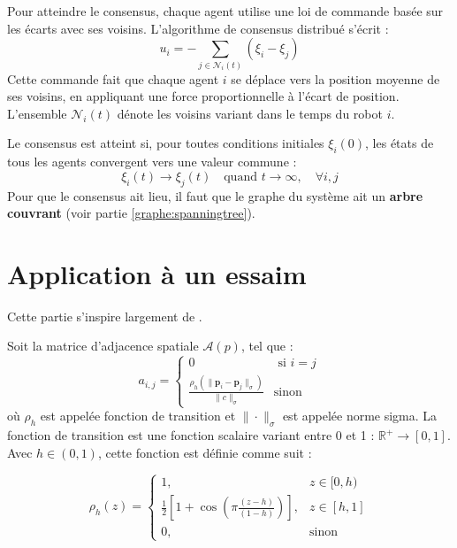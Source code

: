 Pour atteindre le consensus, chaque agent utilise une loi de commande basée sur les écarts avec ses voisins. L'algorithme de consensus distribué s'écrit :
\begin{equation}
    u_i = -\sum_{j \in \mathcal{N}_i(t)} (\xi_i - \xi_j)
\end{equation}
Cette commande fait que chaque agent $i$ se déplace vers la position moyenne de ses voisins, en appliquant une force proportionnelle à l'écart de position. L'ensemble $\mathcal{N}_i(t)$ dénote les voisins variant dans le temps du robot $i$.

Le consensus est atteint si, pour toutes conditions initiales $\xi_i(0)$, les états de tous les agents convergent vers une valeur commune :
$$\xi_i(t) \to \xi_j(t) \quad \text{quand } t \to \infty, \quad \forall i,j$$
Pour que le consensus ait lieu, il faut que le graphe du système ait un \textbf{arbre couvrant} (voir partie \ref{graphe:spanningtree}).

\section{Application à un essaim}

\noindent Cette partie s'inspire largement de \cite{koung_cooperative_2022,olfati-saber_flocking_2006,saif_distributed_2019}.

\noindent Soit la matrice d'adjacence spatiale $\mathcal{A}(p)$, tel que : 
\begin{equation}
    a_{i,j} =
    \begin{cases}
    0 & \text{ si } i=j  
     \\
    \frac{\rho_h(\|\mathbf{p}_i - \mathbf{p}_j\|_\sigma)}{\|c\|_\sigma} & \text{sinon}
    \end{cases}
\end{equation}
où $\rho_h$ est appelée fonction de transition et $\|\cdot\|_\sigma$ est appelée norme sigma. La fonction de transition est une fonction scalaire variant entre 0 et 1 : $\mathbb{R}^+ \to [0, 1]$. Avec $h \in (0, 1)$, cette fonction est définie comme suit :

\begin{equation}
\rho_h(z) = \begin{cases}
1, & z \in [0, h) \\
\frac{1}{2}\left[1 + \cos\left(\pi \frac{(z - h)}{(1 - h)}\right)\right], & z \in [h, 1] \\
0, & \text{sinon}
\end{cases} \tag{2.14}
\end{equation}


